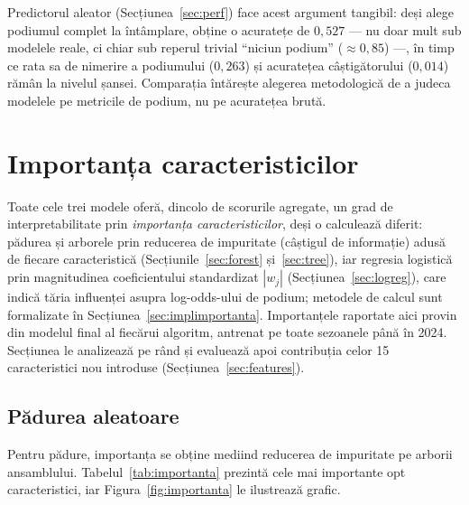 \documentclass[12pt,a4paper]{report}
\begin{document}
Predictorul aleator (Secțiunea~\ref{sec:perf}) face acest argument tangibil: deși alege podiumul
complet la întâmplare, obține o acuratețe de $0{,}527$ --- nu doar mult sub modelele reale, ci chiar
sub reperul trivial ``niciun podium'' ($\approx 0{,}85$) ---, în timp ce rata sa de nimerire a
podiumului ($0{,}263$) și acuratețea câștigătorului ($0{,}014$) rămân la nivelul șansei. Comparația
întărește alegerea metodologică de a judeca modelele pe metricile de podium, nu pe acuratețea brută.

\section{Importanța caracteristicilor}
\label{sec:importanta}

Toate cele trei modele oferă, dincolo de scorurile agregate, un grad de interpretabilitate prin
\emph{importanța caracteristicilor}, deși o calculează diferit: pădurea și arborele prin reducerea
de impuritate (câștigul de informație) adusă de fiecare caracteristică (Secțiunile~\ref{sec:forest}
și~\ref{sec:tree}), iar regresia logistică prin magnitudinea coeficientului standardizat $|w_j|$
(Secțiunea~\ref{sec:logreg}), care indică tăria influenței asupra log-odds-ului de podium; metodele
de calcul sunt formalizate în Secțiunea~\ref{sec:implimportanta}.
Importanțele raportate aici provin din modelul final al fiecărui algoritm, antrenat pe toate
sezoanele până în 2024. Secțiunea le analizează pe rând și evaluează apoi contribuția celor 15
caracteristici nou introduse (Secțiunea~\ref{sec:features}).

\subsection{Pădurea aleatoare}

Pentru pădure, importanța se obține mediind reducerea de impuritate pe arborii ansamblului.
Tabelul~\ref{tab:importanta} prezintă cele mai importante opt caracteristici, iar
Figura~\ref{fig:importanta} le ilustrează grafic.
\end{document}
